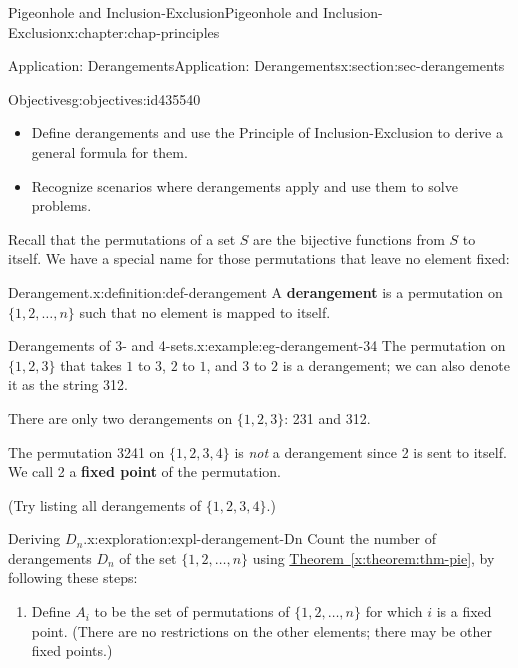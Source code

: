 \documentclass[oneside,10pt,]{book}
\newcommand{\xreffont}{\relax}
\newcommand{\terminology}[1]{\textbf{#1}}
\numberwithin{equation}{section}
\begin{document}
\begin{chapterptx}{Pigeonhole and Inclusion-Exclusion}{}{Pigeonhole and Inclusion-Exclusion}{}{}{x:chapter:chap-principles}
%
%
\typeout{************************************************}
\typeout{************************************************}
%
\begin{sectionptx}{Application: Derangements}{}{Application: Derangements}{}{}{x:section:sec-derangements}
\begin{objectives}{Objectives}{g:objectives:id435540}
%
\begin{itemize}[label=\textbullet]
\item{}Define derangements and use the Principle of Inclusion-Exclusion to derive a general formula for them.%
\item{}Recognize scenarios where derangements apply and use them to solve problems.%
\end{itemize}
\end{objectives}
Recall that the permutations of a set \(S\) are the bijective functions from \(S\) to itself. We have a special name for those permutations that leave no element fixed:%
\begin{definition}{Derangement.}{x:definition:def-derangement}%
A \terminology{derangement} is a permutation on \(\{1,2,\ldots,n\}\) such that no element is mapped to itself.%
\end{definition}
\begin{example}{Derangements of 3- and 4-sets.}{x:example:eg-derangement-34}%
The permutation on \(\{1,2,3\}\) that takes \(1\) to \(3\), \(2\) to \(1\), and \(3\) to \(2\) is a derangement; we can also denote it as the string 312.%
\par
There are only two derangements on \(\{1,2,3\}\): 231 and 312.%
\par
The permutation 3241 on \(\{1,2,3,4\}\) is \emph{not} a derangement since 2 is sent to itself. We call 2 a \terminology{fixed point} of the permutation.%
\par
(Try listing all derangements of \(\{1,2,3,4\}\).)%
\end{example}
\begin{exploration}{Deriving \(D_n\).}{x:exploration:expl-derangement-Dn}%
Count the number of derangements \(D_n\) of the set \(\{1,2,\ldots,n\}\) using \hyperref[x:theorem:thm-pie]{Theorem~{\xreffont\ref{x:theorem:thm-pie}}}, by following these steps: \label{g:notation:id435957}%
\begin{enumerate}[font=\bfseries,label=(\alph*),ref=\alph*]
\item{}Define \(A_i\) to be the set of permutations of \(\{1,2,\ldots,n\}\) for which \(i\) is a fixed point. (There are no restrictions on the other elements; there may be other fixed points.)%

\end{enumerate}
\end{exploration}
\end{sectionptx}
\end{chapterptx}
\end{document}
